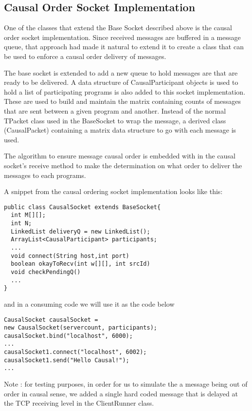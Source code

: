 \documentclass[10pt,journal,compsoc]{IEEEtran}
\begin{document}
\subsection{Causal Order Socket Implementation}
One of the classes that extend the Base Socket described above is the causal order socket implementation. Since received messages are buffered in a message queue, that approach had made it natural to extend it to create a class that can be used to enforce a causal order delivery of messages.

The base socket is extended to add a new queue to hold messages are that are ready to be delivered. A data structure of CausalParticipant objects is used to hold a list of participating programs is also added to this socket implementation. These are used to build and maintain the matrix containing counts of messages that are sent between a given program and another. Instead of the normal TPacket class used in the BaseSocket to wrap the message, a derived class (CausalPacket) containing  a matrix data structure to go with each message is used.

The algorithm to ensure message causal order is embedded with in the causal socket's receive method to make the determination on what order to deliver the messages to each programs.

A snippet from the causal ordering socket implementation looks like this:

\begin{lstlisting}
public class CausalSocket extends BaseSocket{
  int M[][];
  int N;
  LinkedList deliveryQ = new LinkedList();
  ArrayList<CausalParticipant> participants;
  ...
  void connect(String host,int port)
  boolean okayToRecv(int w[][], int srcId)
  void checkPendingQ()
  ...
}
\end{lstlisting}

and in a consuming code we will use it as the code below

\begin{lstlisting}
CausalSocket causalSocket = 
new CausalSocket(servercount, participants);
causalSocket.bind("localhost", 6000);
...
causalSocket1.connect("localhost", 6002);
causalSocket1.send("Hello Causal!");
...

\end{lstlisting}

Note : for testing purposes, in order for us to simulate the a message being out of order in causal sense, we added a single hard coded message that is delayed at the TCP receiving level in the ClientRunner class.
\end{document}
